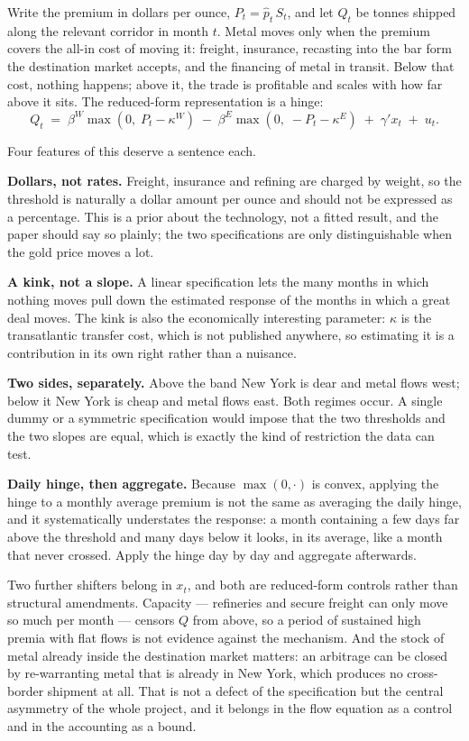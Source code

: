 \documentclass[11pt,a4paper]{article}
\newcommand{\phat}{\widehat{p}_t}
\begin{document}
Write the premium in dollars per ounce, $P_t = \phat\,S_t$, and let $Q_t$ be
tonnes shipped along the relevant corridor in month $t$. Metal moves only when
the premium covers the all-in cost of moving it: freight, insurance, recasting
into the bar form the destination market accepts, and the financing of metal in
transit. Below that cost, nothing happens; above it, the trade is profitable
and scales with how far above it sits. The reduced-form representation is a
hinge:
\begin{equation}
Q_t \;=\;
\beta^{W}\max\!\left(0,\;P_t-\kappa^{W}\right)
\;-\;\beta^{E}\max\!\left(0,\;-P_t-\kappa^{E}\right)
\;+\;\gamma' x_t \;+\; u_t .
\label{eq:hinge}
\end{equation}

Four features of this deserve a sentence each.

\textbf{Dollars, not rates.} Freight, insurance and refining are charged by
weight, so the threshold is naturally a dollar amount per ounce and should not
be expressed as a percentage. This is a prior about the technology, not a
fitted result, and the paper should say so plainly; the two specifications are
only distinguishable when the gold price moves a lot.

\textbf{A kink, not a slope.} A linear specification lets the many months in
which nothing moves pull down the estimated response of the months in which a
great deal moves. The kink is also the economically interesting parameter:
$\kappa$ is the transatlantic transfer cost, which is not published anywhere,
so estimating it is a contribution in its own right rather than a nuisance.

\textbf{Two sides, separately.} Above the band New York is dear and metal flows
west; below it New York is cheap and metal flows east. Both regimes occur. A
single dummy or a symmetric specification would impose that the two thresholds
and the two slopes are equal, which is exactly the kind of restriction the
data can test.

\textbf{Daily hinge, then aggregate.} Because $\max(0,\cdot)$ is convex,
applying the hinge to a monthly average premium is not the same as averaging
the daily hinge, and it systematically understates the response: a month
containing a few days far above the threshold and many days below it looks, in
its average, like a month that never crossed. Apply the hinge day by day and
aggregate afterwards.

Two further shifters belong in $x_t$, and both are reduced-form controls rather
than structural amendments. Capacity --- refineries and secure freight can only
move so much per month --- censors $Q$ from above, so a period of sustained
high premia with flat flows is not evidence against the mechanism. And the
stock of metal already inside the destination market matters: an arbitrage can
be closed by re-warranting metal that is already in New York, which produces no
cross-border shipment at all. That is not a defect of the specification but the
central asymmetry of the whole project, and it belongs in the flow equation as a
control and in the accounting as a bound.
\end{document}
